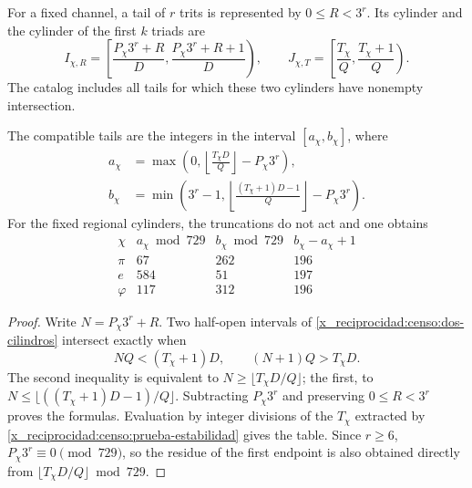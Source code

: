 For a fixed channel, a tail of \(r\) trits is represented by
\(0\leq R<3^r\). Its cylinder and the cylinder of the first \(k\)
triads are
\begin{equation}
 I_{\chi,R}=\left[\frac{P_\chi3^r+R}{D},
                       \frac{P_\chi3^r+R+1}{D}\right),\qquad
 J_{\chi,T}=\left[\frac{T_\chi}{Q},\frac{T_\chi+1}{Q}\right).
 \label{x_reciprocidad:censo:dos-cilindros}
\end{equation}
The catalog includes all tails for which these two cylinders
have nonempty intersection.

\begin{proposition}
\label{x_reciprocidad:censo:catalogos}
The compatible tails are the integers in the interval \([a_\chi,b_\chi]\),
where
\begin{align}
 a_\chi&=\max\left(0,
       \left\lfloor\frac{T_\chi D}{Q}\right\rfloor-P_\chi3^r\right),
       \label{x_reciprocidad:censo:extremo-a}\\
 b_\chi&=\min\left(3^r-1,
       \left\lfloor\frac{(T_\chi+1)D-1}{Q}\right\rfloor-P_\chi3^r\right).
       \label{x_reciprocidad:censo:extremo-b}
\end{align}
For the fixed regional cylinders, the truncations do not act and one obtains
\begin{equation}
\begin{array}{c|r|r|r}
 \chi&a_\chi\bmod729&b_\chi\bmod729&b_\chi-a_\chi+1\\\hline
 \pi&67&262&196\\
 e&584&51&197\\
 \varphi&117&312&196
\end{array}
\label{x_reciprocidad:censo:tabla-catalogos}
\end{equation}
\end{proposition}
\begin{proof}
Write \(N=P_\chi3^r+R\). Two half-open intervals of
\eqref{x_reciprocidad:censo:dos-cilindros} intersect exactly when
\[
 NQ<(T_\chi+1)D,\qquad (N+1)Q>T_\chi D.
\]
The second inequality is equivalent to
\(N\geq\lfloor T_\chi D/Q\rfloor\); the first, to
\(N\leq\lfloor((T_\chi+1)D-1)/Q\rfloor\). Subtracting
\(P_\chi3^r\) and preserving \(0\leq R<3^r\) proves the formulas.
Evaluation by integer divisions of the \(T_\chi\) extracted by
\eqref{x_reciprocidad:censo:prueba-estabilidad} gives the table. Since \(r\geq6\),
\(P_\chi3^r\equiv0\pmod{729}\), so the residue of the first
endpoint is also obtained directly from
\(\lfloor T_\chi D/Q\rfloor\bmod729\).
\end{proof}

